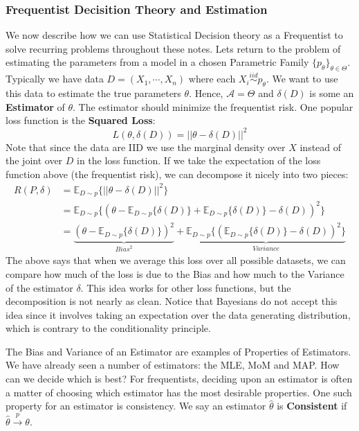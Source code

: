 \documentclass[]{article}
\theoremstyle{mattstyle}
\theoremstyle{definition}
\begin{document}
\subsubsection{Frequentist Decisition Theory and Estimation}
We now describe how we can use Statistical Decision theory as a Frequentist to solve recurring problems throughout these notes. Lets return to the problem of estimating the parameters from a model in a chosen Parametric Family $\{p_{\theta}\}_{\theta\in\Theta}$. Typically we have data \(D=(X_1, \cdots, X_n)\) where each \(X_i\overset{iid}{\sim} p_{\theta}\). We want to use this data to estimate the true parameters \(\theta\). Hence, \(\mathcal{A} = \Theta\) and $\delta(D)$ is some an \textbf{Estimator} of \(\theta\). The estimator should minimize the frequentist risk. One popular loss function is the \textbf{Squared Loss}: 
$$L(\theta,\delta(D)) = ||\theta-\delta(D)||^2$$
Note that since the data are IID we use the marginal density over $X$ instead of the joint over $D$ in the loss function. If we take the expectation of the loss function above (the frequentist risk), we can decompose it nicely into two pieces:
\begin{align*}
R(P,\delta)&=\mathbb{E}_{D\sim p}\{||\theta-\delta(D)||^2\}\\
&=\mathbb{E}_{D\sim p}\{(\theta-\mathbb{E}_{D\sim p}\{\delta(D)\} + \mathbb{E}_{D\sim p}\{\delta(D)\} - \delta(D))^2\}\\
&=\underbrace{(\theta-\mathbb{E}_{D\sim p}\{\delta(D)\})^2}_{Bias^2} + \underbrace{\mathbb{E}_{D\sim p}\{(\mathbb{E}_{D\sim p}\{\delta(D)\} - \delta(D))^2\}}_{Variance}
\end{align*}
The above says that when we average this loss over all possible datasets, we can compare how much of the loss is due to the Bias and how much to the Variance of the estimator $\delta$. This idea works for other loss functions, but the decomposition is not nearly as clean. Notice that Bayesians do not accept this idea since it involves taking an expectation over the data generating distribution, which is contrary to the conditionality principle.

The Bias and Variance of an Estimator are examples of Properties of Estimators. We have already seen a number of estimators: the MLE, MoM and MAP. How can we decide which is best? For frequentists, deciding upon an estimator is often a matter of choosing which estimator has the most desirable properties. One such property for an estimator is consistency. We say an estimator $\hat{\theta}$ is \textbf{Consistent} if $\hat{\theta} \overset{p}{\rightarrow} \theta$.
\end{document}
